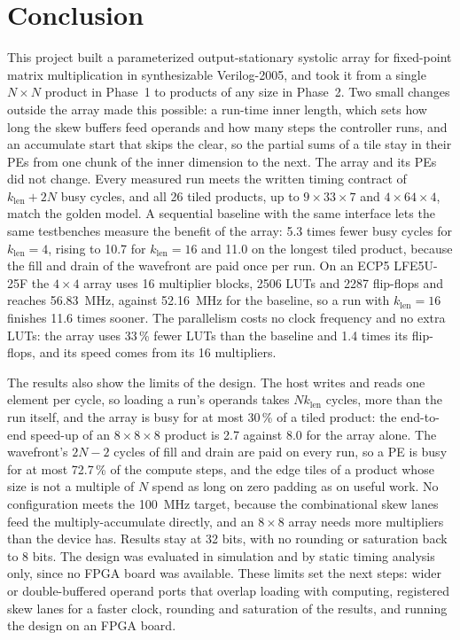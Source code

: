 
\section{Conclusion}
This project built a parameterized output-stationary systolic array for fixed-point matrix multiplication in synthesizable Verilog-2005, and took it from a single $N \times N$ product in Phase~1 to products of any size in Phase~2. Two small changes outside the array made this possible: a run-time inner length, which sets how long the skew buffers feed operands and how many steps the controller runs, and an accumulate start that skips the clear, so the partial sums of a tile stay in their PEs from one chunk of the inner dimension to the next. The array and its PEs did not change. Every measured run meets the written timing contract of $k_{\mathrm{len}} + 2N$ busy cycles, and all 26 tiled products, up to $9 \times 33 \times 7$ and $4 \times 64 \times 4$, match the golden model. A sequential baseline with the same interface lets the same testbenches measure the benefit of the array: 5.3 times fewer busy cycles for $k_{\mathrm{len}} = 4$, rising to 10.7 for $k_{\mathrm{len}} = 16$ and 11.0 on the longest tiled product, because the fill and drain of the wavefront are paid once per run. On an ECP5 LFE5U-25F the $4 \times 4$ array uses 16 multiplier blocks, 2506 LUTs and 2287 flip-flops and reaches 56.83~MHz, against 52.16~MHz for the baseline, so a run with $k_{\mathrm{len}} = 16$ finishes 11.6 times sooner. The parallelism costs no clock frequency and no extra LUTs: the array uses 33\,\% fewer LUTs than the baseline and 1.4 times its flip-flops, and its speed comes from its 16 multipliers.

The results also show the limits of the design. The host writes and reads one element per cycle, so loading a run's operands takes $N k_{\mathrm{len}}$ cycles, more than the run itself, and the array is busy for at most 30\,\% of a tiled product: the end-to-end speed-up of an $8 \times 8 \times 8$ product is 2.7 against 8.0 for the array alone. The wavefront's $2N - 2$ cycles of fill and drain are paid on every run, so a PE is busy for at most 72.7\,\% of the compute steps, and the edge tiles of a product whose size is not a multiple of $N$ spend as long on zero padding as on useful work. No configuration meets the 100~MHz target, because the combinational skew lanes feed the multiply-accumulate directly, and an $8 \times 8$ array needs more multipliers than the device has. Results stay at 32 bits, with no rounding or saturation back to 8 bits. The design was evaluated in simulation and by static timing analysis only, since no FPGA board was available. These limits set the next steps: wider or double-buffered operand ports that overlap loading with computing, registered skew lanes for a faster clock, rounding and saturation of the results, and running the design on an FPGA board.
